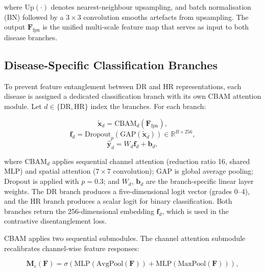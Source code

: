 \documentclass[review,12pt]{elsarticle}
\begin{document}
where $\text{Up}(\cdot)$ denotes nearest-neighbour upsampling, and batch
normalisation (BN) followed by a $3 \times 3$ convolution smooths artefacts
from upsampling. The output $\mathbf{F}_{\text{fpn}}$ is the unified
multi-scale feature map that serves as input to both disease branches.

\subsection{Disease-Specific Classification Branches}

To prevent feature entanglement between DR and HR representations, each
disease is assigned a dedicated classification branch with its own CBAM
attention module. Let $d \in \{\text{DR}, \text{HR}\}$ index the branches.
For each branch:

\begin{equation}
  \tilde{\mathbf{x}}_d = \text{CBAM}_d(\mathbf{F}_{\text{fpn}}),
  \label{eq:cbam}
\end{equation}
\begin{equation}
  \mathbf{f}_d = \text{Dropout}_p\!\left(\text{GAP}(\tilde{\mathbf{x}}_d)\right)
  \in \mathbb{R}^{B \times 256},
  \label{eq:branch_feat}
\end{equation}
\begin{equation}
  \hat{\mathbf{y}}_d = W_d \mathbf{f}_d + \mathbf{b}_d,
  \label{eq:branch_head}
\end{equation}

where $\text{CBAM}_d$ applies sequential channel attention (reduction ratio 16,
shared MLP) and spatial attention ($7 \times 7$ convolution); GAP is global
average pooling; Dropout is applied with $p = 0.3$; and $W_d$, $\mathbf{b}_d$
are the branch-specific linear layer weights. The DR branch produces a
five-dimensional logit vector (grades 0--4), and the HR branch produces a
scalar logit for binary classification. Both branches return the 256-dimensional
embedding $\mathbf{f}_d$, which is used in the contrastive disentanglement
loss.

CBAM applies two sequential submodules. The channel attention submodule
\cite{woo2018} recalibrates channel-wise feature responses:

\begin{equation}
  \mathbf{M}_c(\mathbf{F}) = \sigma\!\left(\text{MLP}\!\left(\text{AvgPool}(\mathbf{F})\right)
  + \text{MLP}\!\left(\text{MaxPool}(\mathbf{F})\right)\right),
  \label{eq:cbam_channel}
\end{equation}
\end{document}
